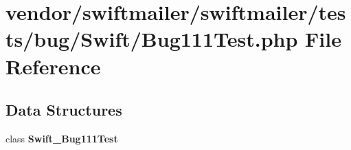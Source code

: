 \section{vendor/swiftmailer/swiftmailer/tests/bug/\+Swift/\+Bug111\+Test.php File Reference}
\label{_bug111_test_8php}
\subsection*{Data Structures}
\begin{DoxyCompactItemize}
\item 
class {\bf Swift\+\_\+\+Bug111\+Test}
\end{DoxyCompactItemize}
